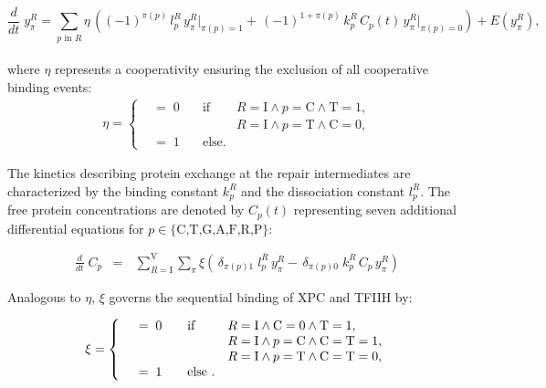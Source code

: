 \begin{equation}\label{eqn:DNAstatesModel}
\frac{d}{dt}\;y_{\pi}^{R} =\sum_{p\text{ in }R}\eta \, \left( (-1)^{\pi(p)} \,l_{p}^{ R}\, y_{\pi}^{R}\left. \right|_{\pi(p)=1}+  \, (-1)^{1+\pi(p)}\, k_{p}^{ R} \,C_p(t)\,y_{\pi}^{R}\left. \right|_{\pi(p)=0}\right ) +E(y_{\pi}^{R}),
\end{equation}\\
where $\eta$ represents a cooperativity ensuring the exclusion of all cooperative binding events:
\begin{align*}
\eta =\left\{
\begin{array}{llll}
& =\; 0 \quad   &\text{if}& R=\text{I} \wedge p=\text{C} \wedge \text{T}=1, \\
&     && R=\text{I} \wedge p=\text{T} \wedge \text{C}=0,\\
& = \; 1 \quad &\text{else}.&
\end{array}
\right.
\end{align*}
  
The kinetics describing protein exchange at the repair intermediates are characterized by the binding constant $k_{p}^{ R}$ and the dissociation constant $l_{p}^{ R}$. The free protein concentrations are denoted by $C_p(t)$ representing seven additional differential equations for $p \in \{\text{C,T,G,A,F,R,P}\}$:

\begin{eqnarray}\label{Eqn:concentration}
\frac{d}{dt}\;C_p&=&\,\sum_{R=\text{I}}^{\text{V}} \sum_{\pi} \xi \left( \,\delta_{\pi (p)1}\;l_{p}^{ R}\, y_{\pi}^{R}- \,\delta_{\pi (p)0}\; k_{p}^{ R} \,C_p\,y_{\pi}^{R}\right)
\end{eqnarray}  

Analogous to $\eta$, $\xi$ governs the sequential binding of XPC and TFIIH by:

\begin{align*}
\xi =\left\{
\begin{array}{l l ll}
& =\; 0 \quad   &\text{if} & R=\text{I} \wedge \text{C}=0 \wedge \text{T}=1, \\
&    && R=\text{I} \wedge p=\text{C} \wedge \text{C}=\text{T}=1, \\
&    &&R=\text{I} \wedge p=\text{T} \wedge \text{C}=\text{T}=0, \\
& = \; 1 \quad& \text{else }.&
\end{array}
\right.
\end{align*}

